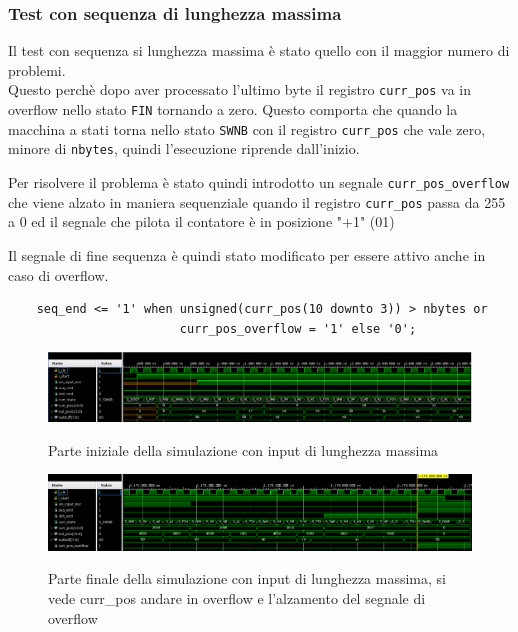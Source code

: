 \documentclass[12pt, a4paper]{article}
\begin{document}

\subsubsection{Test con sequenza di lunghezza massima}

Il test con sequenza si lunghezza massima è stato quello con il maggior numero di problemi. \\
Questo perchè dopo aver processato l'ultimo byte il registro \texttt{curr\_pos} va in overflow
nello stato \texttt{FIN} tornando a zero.
\noindent Questo comporta che quando la macchina a stati torna nello stato \texttt{SWNB} con il registro \texttt{curr\_pos} 
che vale zero, minore di \texttt{nbytes}, quindi l'esecuzione riprende dall'inizio.

\noindent Per risolvere il problema è stato quindi introdotto un segnale \texttt{curr\_pos\_overflow} che viene alzato in maniera sequenziale
quando il registro \texttt{curr\_pos} passa da 255 a 0 ed il segnale che pilota il contatore è in posizione "+1" (01)

\noindent Il segnale di fine sequenza è quindi stato modificato per essere attivo anche in caso di
overflow.

\begin{verbatim}
    seq_end <= '1' when unsigned(curr_pos(10 downto 3)) > nbytes or 
                        curr_pos_overflow = '1' else '0';
\end{verbatim}

\begin{figure}[h!]
    \centering
    \includegraphics[scale=0.3]{sim_maxlen_init.png}
    \label{img:sim_max_init}
    \caption{Parte iniziale della simulazione con input di lunghezza massima}
\end{figure}

\begin{figure}[h!]
    \centering
    \includegraphics[scale=0.3]{sim_maxlen_end.png}
    \label{img:sim_max_end}
    \caption{Parte finale della simulazione con input di lunghezza massima, si vede curr\_pos andare in overflow e l'alzamento del segnale di overflow}
\end{figure}
\end{document}

